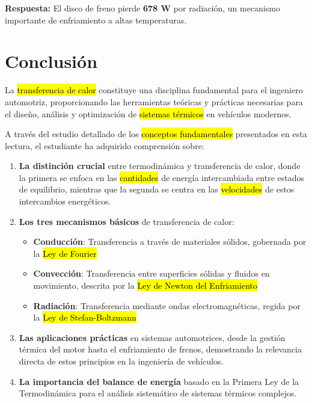 \documentclass{article}
\begin{document}
    \textbf{Respuesta:} El disco de freno pierde \textbf{678 W} por radiación, un mecanismo importante de enfriamiento a altas temperaturas.

    \section{Conclusión}

    La \hl{transferencia de calor} constituye una disciplina fundamental para el ingeniero automotriz, proporcionando las herramientas teóricas y prácticas necesarias para el diseño, análisis y optimización de \hl{sistemas térmicos} en vehículos modernos.

    A través del estudio detallado de los \hl{conceptos fundamentales} presentados en esta lectura, el estudiante ha adquirido comprensión sobre:

    \begin{enumerate}
        \item \textbf{La distinción crucial} entre termodinámica y transferencia de calor, donde la primera se enfoca en las \hl{cantidades} de energía intercambiada entre estados de equilibrio, mientras que la segunda se centra en las \hl{velocidades} de estos intercambios energéticos.

        \item \textbf{Los tres mecanismos básicos} de transferencia de calor:
        \begin{itemize}
            \item \textbf{Conducción}: Transferencia a través de materiales sólidos, gobernada por la \hl{Ley de Fourier}
            \item \textbf{Convección}: Transferencia entre superficies sólidas y fluidos en movimiento, descrita por la \hl{Ley de Newton del Enfriamiento}
            \item \textbf{Radiación}: Transferencia mediante ondas electromagnéticas, regida por la \hl{Ley de Stefan-Boltzmann}
        \end{itemize}

        \item \textbf{Las aplicaciones prácticas} en sistemas automotrices, desde la gestión térmica del motor hasta el enfriamiento de frenos, demostrando la relevancia directa de estos principios en la ingeniería de vehículos.

        \item \textbf{La importancia del balance de energía} basado en la Primera Ley de la Termodinámica para el análisis sistemático de sistemas térmicos complejos.
    \end{enumerate}
\end{document}
